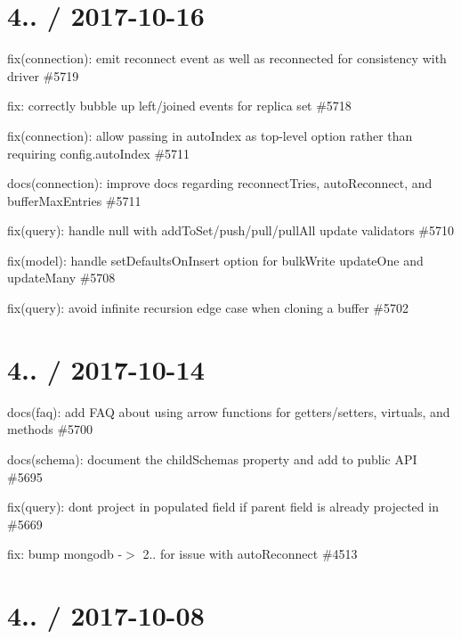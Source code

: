 \section*{4.. / 2017-\/10-\/16 }


\begin{DoxyItemize}
\item fix(connection)\+: emit \textquotesingle{}reconnect\textquotesingle{} event as well as \textquotesingle{}reconnected\textquotesingle{} for consistency with driver \#5719
\item fix\+: correctly bubble up left/joined events for replica set \#5718
\item fix(connection)\+: allow passing in {\ttfamily auto\+Index} as top-\/level option rather than requiring {\ttfamily config.\+auto\+Index} \#5711
\item docs(connection)\+: improve docs regarding reconnect\+Tries, auto\+Reconnect, and buffer\+Max\+Entries \#5711
\item fix(query)\+: handle null with add\+To\+Set/push/pull/pull\+All update validators \#5710
\item fix(model)\+: handle set\+Defaults\+On\+Insert option for bulk\+Write update\+One and update\+Many \#5708
\item fix(query)\+: avoid infinite recursion edge case when cloning a buffer \#5702
\end{DoxyItemize}

\section*{4.. / 2017-\/10-\/14 }


\begin{DoxyItemize}
\item docs(faq)\+: add F\+AQ about using arrow functions for getters/setters, virtuals, and methods \#5700
\item docs(schema)\+: document the child\+Schemas property and add to public A\+PI \#5695
\item fix(query)\+: don\textquotesingle{}t project in populated field if parent field is already projected in \#5669
\item fix\+: bump mongodb -\/$>$ 2.. for issue with auto\+Reconnect \#4513
\end{DoxyItemize}

\section*{4.. / 2017-\/10-\/08 }


